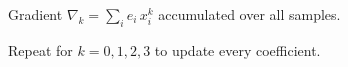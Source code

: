 \documentclass[preview]{standalone}
\begin{document}
\begin{center}
Gradient $\nabla_k = \sum_i e_i \, x_i^k$ accumulated over all samples.\\Repeat for $k = 0, 1, 2, 3$ to update every coefficient.
\end{center}
\end{document}
